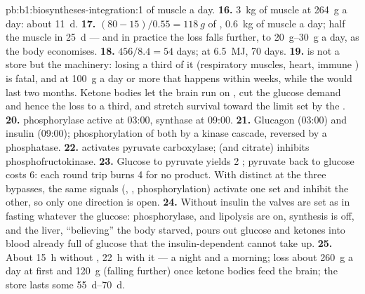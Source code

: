 \begin{solution}{pb:b1:biosyntheses-integration:1}
of muscle a day.
\textbf{16.} \qty{3}{kg} of muscle  at \qty{264}{g} a day:
about \qty{11}{d}.
\textbf{17.} $(80 - 15)/0.55 = \qty{118}{g}$ of , \qty{0.6}{kg}
of muscle a day; half the muscle in \qty{25}{d} --- and in practice
the loss falls further, to \qtyrange{20}{30}{g} a day, as the body
economises.
\textbf{18.} $456/8.4 = 54$ days; at \qty{6.5}{MJ}, 70 days.
\textbf{19.}  is not a store but the machinery: losing a third
of it (respiratory muscles, heart, immune ) is fatal, and at
\qty{100}{g} a day or more that happens within weeks, while the 
would last two months. Ketone bodies let the brain run on , cut the
glucose demand and hence the  loss to a third, and stretch
survival toward the limit set by the .
\textbf{20.}  phosphorylase active at 03:00,  synthase
at 09:00.
\textbf{21.} Glucagon (03:00) and insulin (09:00); phosphorylation of
both  by a kinase cascade, reversed by a phosphatase.
\textbf{22.}  activates pyruvate carboxylase;  (and
citrate) inhibits phosphofructokinase.
\textbf{23.} Glucose to pyruvate yields 2 ; pyruvate back to
glucose costs 6: each round trip burns 4  for no product. With
distinct  at the three bypasses, the same signals (,
, phosphorylation) activate one set and inhibit the other,
so only one direction is open.
\textbf{24.} Without insulin the valves are set as in fasting whatever
the glucose: phosphorylase,  and lipolysis are on,
synthesis is off, and the liver, ``believing'' the body starved, pours
out glucose and ketones into blood already full of glucose that the
insulin-dependent  cannot take up.
\textbf{25.} About \qty{15}{h} without , \qty{22}{h}
with it --- a night and a morning;  loss about \qty{260}{g} a
day at first and \qty{120}{g} (falling further) once ketone bodies feed
the brain; the  store lasts some \qtyrange{55}{70}{d}.
\end{solution}
